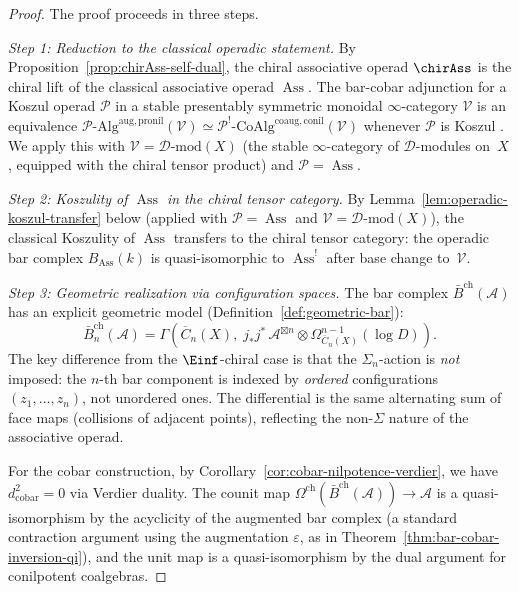 \begin{proof}
The proof proceeds in three steps.

\emph{Step 1: Reduction to the classical operadic statement.}
By Proposition~\ref{prop:chirAss-self-dual}, the chiral associative
operad $\chirAss$ is the chiral lift of the classical associative
operad $\operatorname{Ass}$.  The bar-cobar adjunction for a Koszul
operad $\mathcal{P}$ in a stable presentably symmetric monoidal
$\infty$-category $\mathcal{V}$ is an equivalence
$\mathcal{P}\text{-Alg}^{\mathrm{aug,pronil}}(\mathcal{V})
\simeq
\mathcal{P}^!\text{-CoAlg}^{\mathrm{coaug,conil}}(\mathcal{V})$
whenever $\mathcal{P}$ is Koszul \cite[Theorem~11.4.1]{LV12}.
We apply this with $\mathcal{V} = \mathcal{D}\text{-mod}(X)$
(the stable $\infty$-category of $\mathcal{D}$-modules on~$X$,
equipped with the chiral tensor product) and
$\mathcal{P} = \operatorname{Ass}$.

\emph{Step 2: Koszulity of $\operatorname{Ass}$ in the chiral
tensor category.}
By Lemma~\ref{lem:operadic-koszul-transfer} below
(applied with $\mathcal{P} = \operatorname{Ass}$ and
$\mathcal{V} = \mathcal{D}\text{-mod}(X)$),
the classical Koszulity of
$\operatorname{Ass}$ \cite[Theorem~7.4.1]{LV12} transfers to the
chiral tensor category: the operadic bar complex
$B_{\operatorname{Ass}}(k)$ is quasi-isomorphic to
$\operatorname{Ass}^!$ after base change to~$\mathcal{V}$.

\emph{Step 3: Geometric realization via configuration spaces.}
The bar complex $\bar{B}^{\mathrm{ch}}(\mathcal{A})$ has an
explicit geometric model (Definition~\ref{def:geometric-bar}):
\[
\bar{B}^{\mathrm{ch}}_n(\mathcal{A})
= \Gamma\!\left(\overline{C}_n(X),\;
j_* j^*\, \mathcal{A}^{\boxtimes n}
\otimes \Omega^{n-1}_{\overline{C}_n(X)}(\log D)\right).
\]
The key difference from the $\Einf$-chiral case is that the
$\Sigma_n$-action is \emph{not} imposed: the $n$-th bar component
is indexed by \emph{ordered} configurations $(z_1, \ldots, z_n)$,
not unordered ones.  The differential is the same alternating sum of
face maps (collisions of adjacent points), reflecting the
non-$\Sigma$ nature of the associative operad.

For the cobar construction, by
Corollary~\ref{cor:cobar-nilpotence-verdier}, we have
$d_{\mathrm{cobar}}^2 = 0$ via Verdier duality.  The counit map
$\Omega^{\mathrm{ch}}(\bar{B}^{\mathrm{ch}}(\mathcal{A}))
\to \mathcal{A}$ is a quasi-isomorphism by the acyclicity of the
augmented bar complex (a standard contraction argument using the
augmentation $\varepsilon$, as in
Theorem~\ref{thm:bar-cobar-inversion-qi}), and the unit map is a
quasi-isomorphism by the dual argument for conilpotent coalgebras.
\end{proof}

